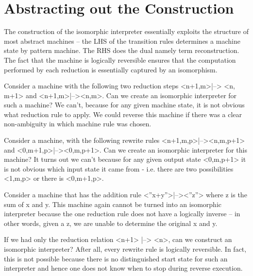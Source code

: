 \documentclass{llncs}
\begin{document}
{%
\section{Abstracting out the Construction}

The construction of the isomorphic interpreter essentially exploits
the structure of most abstract machines -- the LHS of the transition
rules determines a machine state by pattern machine. The RHS does the
dual namely term reconstruction. The fact that the machine is
logically reversible ensures that the computation performed by each
reduction is essentially captured by an isomorphism. 

Consider a machine with the following two reduction steps
{{<n+1,m>|--> <n, m+1>}} and {{<n+1,m>|--><n,m>}}. Can we create an
isomorphic interpreter for such a machine? We can't, because for any
given machine state, it is not obvious what reduction rule to
apply. We could reverse this machine if there was a clear
non-ambiguity in which machine rule was chosen.

Consider a machine, with the following rewrite rules
{{<n+1,m,p>|--><n,m,p+1>}} and {{<0,m+1,p>|--><0,m,p+1>}}. Can we
create an isomorphic interpreter for this machine? It turns out we
can't because for any given output state {{<0,m,p+1>}} it is not
obvious which input state it came from - i.e. there are two
possibilities {{<1,m,p>}} or there is {{<0,m+1,p>}}.

Consider a machine that has the addition rule {{<''x+y''>|--><''z''>}}
where {{z}} is the sum of {{x}} and {{y}}. This machine again cannot
be turned into an isomorphic interpreter because the one reduction
rule does not have a logically inverse -- in other words, given a
{{z}}, we are unable to determine the original {{x}} and {{y}}.

If we had only the reduction relation {{<n+1> |--> <n>}}, can we
construct an isomorphic interpreter? After all, every rewrite rule is
logically reversible. In fact, this is not possible because there is
no distinguished start state for such an interpreter and hence one
does not know when to stop during reverse execution.


}
\end{document}
